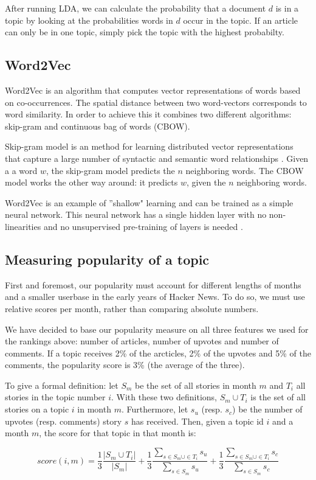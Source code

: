 After running LDA, we can calculate the probability that a document $d$ is in a topic by looking at the probabilities words in $d$ occur in the topic. If an article can only be in one topic, simply pick the topic with the highest probabilty.

\subsection{Word2Vec}
Word2Vec is an algorithm that computes vector representations of words based on co-occurrences. The spatial distance between two word-vectors corresponds to word similarity. In order to achieve this it combines two different algorithms: skip-gram and continuous bag of words (CBOW).

Skip-gram model is an method for learning distributed vector representations that capture a large number of syntactic and semantic word relationships \cite{mikolov2013distributed}. Given a a word $w$, the skip-gram model predicts the $n$ neighboring words. The CBOW model works the other way around: it predicts $w$, given the $n$ neighboring words. 

Word2Vec is an example of ''shallow" learning and can be trained as a simple neural network. This neural network has a single hidden layer with no non-linearities and no unsupervised pre-training of layers is needed \cite{wang2014introduction}. 

\subsection{Measuring popularity of a topic}
First and foremost, our popularity must account for different lengths of months and a smaller userbase in the early years of Hacker News. To do so, we must use relative scores per month, rather than comparing absolute numbers.

We have decided to base our popularity measure on all three features we used for the rankings above: number of articles, number of upvotes and number of comments. If a topic receives 2\% of the arcticles, 2\% of the upvotes and 5\% of the comments, the popularity score is 3\% (the average of the three).

To give a formal definition: let $S_m$ be the set of all stories in month $m$ and $T_i$ all stories in the topic number $i$. With these two definitions, $S_m \cup T_i$ is the set of all stories on a topic $i$ in month $m$. Furthermore, let $s_u$ (resp. $s_c$) be the number of upvotes (resp. comments) story $s$ has received. Then, given a topic id $i$ and a month $m$, the score for that topic in that month is:

$$
	score(i, m) = 
		\frac{1}{3} \frac{|S_m \cup T_i|}{|S_m|} + 
		\frac{1}{3} \frac{\sum_{s \in S_m \cup \in T_i} s_u}{\sum_{s \in S_m} s_u}  + 
		\frac{1}{3} \frac{\sum_{s \in S_m \cup \in T_i} s_c}{\sum_{s \in S_m} s_c}
$$
